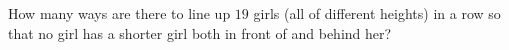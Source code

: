 \documentclass[varwidth]{standalone}
\begin{document}
    How many ways are there to line up $19$ girls (all of different heights) in a row so that no girl has a shorter girl both in front of and behind her?
\end{document}
